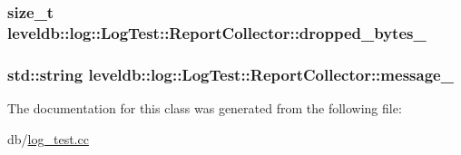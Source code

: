 \subsubsection[{dropped\+\_\+bytes\+\_\+}]{\setlength{\rightskip}{0pt plus 5cm}size\+\_\+t leveldb\+::log\+::\+Log\+Test\+::\+Report\+Collector\+::dropped\+\_\+bytes\+\_\+}\label{classleveldb_1_1log_1_1_log_test_1_1_report_collector_a9eac3288b67c70eb53b4694fcd1f69d6}
\hypertarget{classleveldb_1_1log_1_1_log_test_1_1_report_collector_ad9e0030ff5a33ebad31ff94be7a649d4}{}
\subsubsection[{message\+\_\+}]{\setlength{\rightskip}{0pt plus 5cm}std\+::string leveldb\+::log\+::\+Log\+Test\+::\+Report\+Collector\+::message\+\_\+}\label{classleveldb_1_1log_1_1_log_test_1_1_report_collector_ad9e0030ff5a33ebad31ff94be7a649d4}


The documentation for this class was generated from the following file\+:\begin{DoxyCompactItemize}
\item 
db/\hyperlink{log__test_8cc}{log\+\_\+test.\+cc}\end{DoxyCompactItemize}
